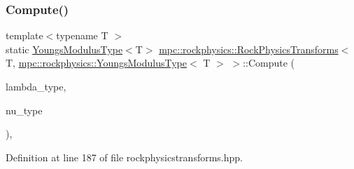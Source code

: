 \subsubsection{\texorpdfstring{Compute()}{Compute()}\hspace{0.1cm}{\footnotesize\ttfamily [4/6]}}
{\footnotesize\ttfamily template$<$typename T $>$ \\
static \mbox{\hyperlink{structmpc_1_1rockphysics_1_1_youngs_modulus_type}{Youngs\+Modulus\+Type}}$<$T$>$ \mbox{\hyperlink{structmpc_1_1rockphysics_1_1_rock_physics_transforms}{mpc\+::rockphysics\+::\+Rock\+Physics\+Transforms}}$<$ T, \mbox{\hyperlink{structmpc_1_1rockphysics_1_1_youngs_modulus_type}{mpc\+::rockphysics\+::\+Youngs\+Modulus\+Type}}$<$ T $>$ $>$\+::Compute (\begin{DoxyParamCaption}\item[{const \mbox{\hyperlink{structmpc_1_1rockphysics_1_1_lame_paramter_modulus_type}{mpc\+::rockphysics\+::\+Lame\+Paramter\+Modulus\+Type}}$<$ T $>$ \&}]{lambda\+\_\+type,  }\item[{const \mbox{\hyperlink{structmpc_1_1rockphysics_1_1_poissons_ratio_type}{mpc\+::rockphysics\+::\+Poissons\+Ratio\+Type}}$<$ T $>$ \&}]{nu\+\_\+type }\end{DoxyParamCaption})\hspace{0.3cm}{\ttfamily [inline]}, {\ttfamily [static]}}



Definition at line 187 of file rockphysicstransforms.\+hpp.

\mbox{\label{structmpc_1_1rockphysics_1_1_rock_physics_transforms_3_01_t_00_01mpc_1_1rockphysics_1_1_youngs_modulus_type_3_01_t_01_4_01_4_aa649c6e5deffc9d8d38823818fb1b75f}} 
